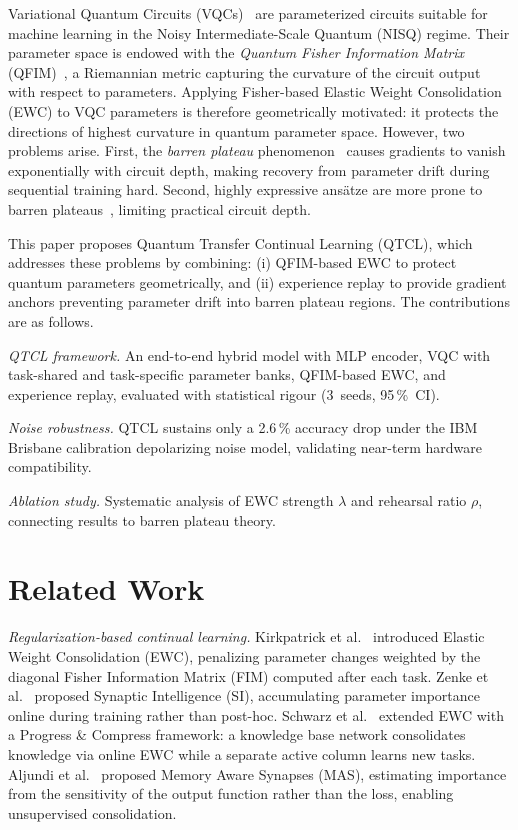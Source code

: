 \documentclass{llncs}
\begin{document}
Variational Quantum Circuits
(VQCs)~\cite{cerezo2021variational,jerbi2023beyond} are parameterized
circuits suitable for machine learning in the Noisy Intermediate-Scale Quantum
(NISQ) regime.
Their parameter space is endowed with the \emph{Quantum Fisher Information
Matrix} (QFIM)~\cite{haug2021}, a Riemannian metric capturing the curvature
of the circuit output with respect to parameters.
Applying Fisher-based Elastic Weight Consolidation (EWC) to VQC parameters is
therefore geometrically motivated: it protects the directions of highest
curvature in quantum parameter space.
However, two problems arise.
First, the \emph{barren plateau} phenomenon~\cite{mcclean2018barren,larocca2024review}
causes gradients to vanish exponentially with circuit depth, making recovery
from parameter drift during sequential training hard.
Second, highly expressive ansätze are more prone to barren
plateaus~\cite{holmes2022connecting}, limiting practical circuit depth.

This paper proposes Quantum Transfer Continual Learning (QTCL), which addresses these problems by combining:
(i) QFIM-based EWC to protect quantum parameters geometrically, and
(ii) experience replay to provide gradient anchors preventing parameter drift
into barren plateau regions.
The contributions are as follows.

\noindent\textit{QTCL framework.}
An end-to-end hybrid model with MLP encoder, VQC with task-shared and
task-specific parameter banks, QFIM-based EWC, and experience replay,
evaluated with statistical rigour (3~seeds, 95\,\%~CI).

\noindent\textit{Noise robustness.}
QTCL sustains only a 2.6\,\% accuracy drop under the IBM\,Brisbane
calibration depolarizing noise model, validating near-term hardware compatibility.

\noindent\textit{Ablation study.}
Systematic analysis of EWC strength $\lambda$ and rehearsal ratio $\rho$,
connecting results to barren plateau theory.

\section{Related Work}
\label{sec:related}

\noindent\textit{Regularization-based continual learning.}
Kirkpatrick et al.~\cite{kirkpatrick2017overcoming} introduced Elastic Weight
Consolidation (EWC), penalizing parameter changes weighted by the diagonal
Fisher Information Matrix (FIM) computed after each task.
Zenke et al.~\cite{zenke2017continual} proposed Synaptic Intelligence (SI),
accumulating parameter importance online during training rather than post-hoc.
Schwarz et al.~\cite{schwarz2018progress} extended EWC with a Progress \& Compress
framework: a knowledge base network consolidates knowledge via online EWC while
a separate active column learns new tasks.
Aljundi et al.~\cite{aljundi2018memory} proposed Memory Aware Synapses (MAS),
estimating importance from the sensitivity of the output function rather than
the loss, enabling unsupervised consolidation.
\end{document}
